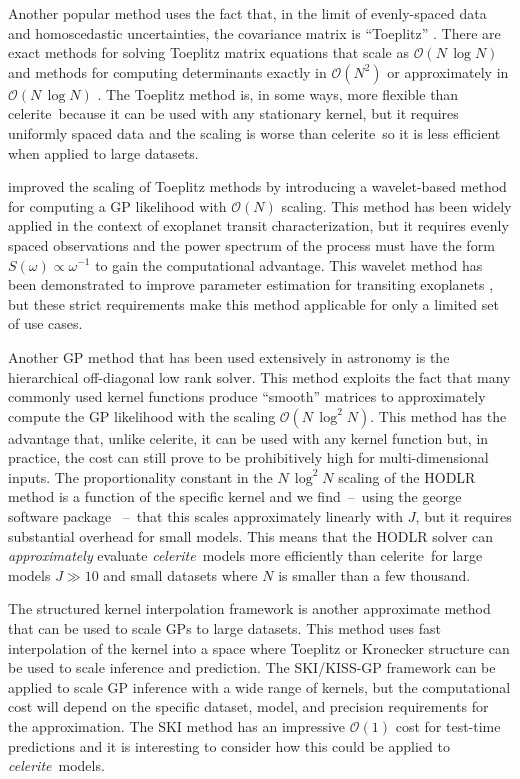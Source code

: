\documentclass[manuscript, letterpaper]{aastex6}
\newcommand{\project}[1]{\textsf{#1}}
\newcommand{\celerite}{\project{celerite}}
\newcommand{\celeriteterm}{\emph{celerite}}
\begin{document}
Another popular method uses the fact that, in the limit of evenly-spaced data
and homoscedastic uncertainties, the covariance matrix is ``Toeplitz''
\citep[for example][]{Dillon:2013}.
There are exact methods for solving Toeplitz matrix equations that scale as
$\mathcal{O}(N\,\log N)$ and methods for computing determinants exactly in
$\mathcal{O}(N^2)$ or approximately in $\mathcal{O}(N\,\log N)$
\citep{Wilson:2014}.
The Toeplitz method is, in some ways, more flexible than \celerite\ because it
can be used with any stationary kernel, but it requires uniformly spaced data
and the scaling is worse than \celerite\ so it is less efficient when applied
to large datasets.

\citet{Carter:2009} improved the scaling of Toeplitz methods by introducing a
wavelet-based method for computing a GP likelihood with $\mathcal{O}(N)$
scaling.
This method has been widely applied in the context of exoplanet transit
characterization, but it requires evenly spaced observations and the power
spectrum of the process must have the form $S(\omega)\propto \omega^{-1}$ to
gain the computational advantage.
This wavelet method has been demonstrated to improve parameter estimation for
transiting exoplanets \citep{Carter:2009}, but these strict requirements make
this method applicable for only a limited set of use cases.


Another GP method that has been used extensively in astronomy is the
hierarchical off-diagonal low rank \citep[HODLR,][]{Ambikasaran:2016} solver.
This method exploits the fact that many commonly used kernel functions produce
``smooth'' matrices to approximately compute the GP likelihood with the
scaling $\mathcal{O}(N\,\log^2 N)$.
This method has the advantage that, unlike \celerite, it can be used with any
kernel function but, in practice, the cost can still prove to be prohibitively
high for multi-dimensional inputs.
The proportionality constant in the $N\,\log^2N$ scaling of the HODLR method
is a function of the specific kernel and we find~--~using the \project{george}
software package \citep{Foreman-Mackey:2014, Ambikasaran:2016}~--~that this
scales approximately linearly with $J$, but it requires substantial overhead
for small models.
This means that the HODLR solver can \emph{approximately} evaluate
\celeriteterm\
models more efficiently than \celerite\ for large models $J \gg 10$ and
small datasets where $N$ is smaller than a few thousand.

The structured kernel interpolation \citep[SKI/KISS-GP][]{Wilson:2015}
framework is another approximate method that can be used to scale GPs to large
datasets.
This method uses fast interpolation of the kernel into a space where Toeplitz
or Kronecker structure can be used to scale inference and prediction.
The SKI/KISS-GP framework can be applied to scale GP inference with a wide
range of kernels, but the computational cost will depend on the specific
dataset, model, and precision requirements for the approximation.
The SKI method has an impressive $\mathcal{O}(1)$ cost for test-time
predictions and it is interesting to consider how this could be applied to
\celeriteterm\ models.
\end{document}
